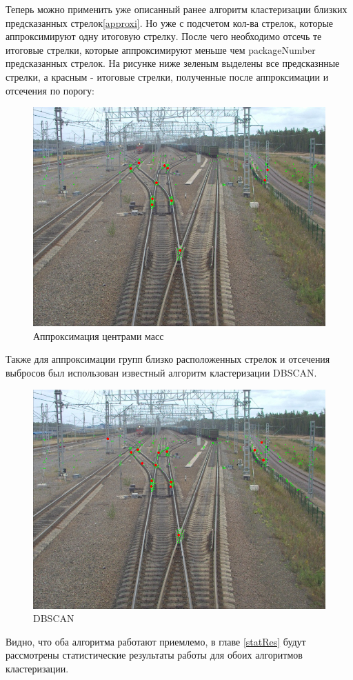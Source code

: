 Теперь можно применить уже описанный ранее алгоритм кластеризации близких предсказанных стрелок\ref{approxi}. Но уже с подсчетом кол-ва стрелок, которые аппроксимируют одну итоговую стрелку. После чего необходимо отсечь те итоговые стрелки, которые аппроксимируют меньше чем packageNumber предсказанных стрелок. На рисунке ниже зеленым выделены все предсказнные стрелки, а красным - итоговые стрелки, полученные после аппроксимации и отсечения по порогу:
\begin{figure}[h!]
	\centering
	\includegraphics[width=0.7\linewidth]{pictures/package1}
	\caption{Аппроксимация центрами масс}
	\label{fig:package1}
\end{figure}
\newpage
Также для аппроксимации групп близко расположенных стрелок и отсечения выбросов был использован известный алгоритм кластеризации DBSCAN\cite{b:dbscan}. 
\begin{figure}[h!]
	\centering
	\includegraphics[width=0.7\linewidth]{pictures/dbscan}
	\caption{DBSCAN}
	\label{fig:package1}
\end{figure}

Видно, что оба алгоритма работают приемлемо, в главе \ref{statRes} будут рассмотрены статистические результаты работы для обоих алгоритмов кластеризации.

